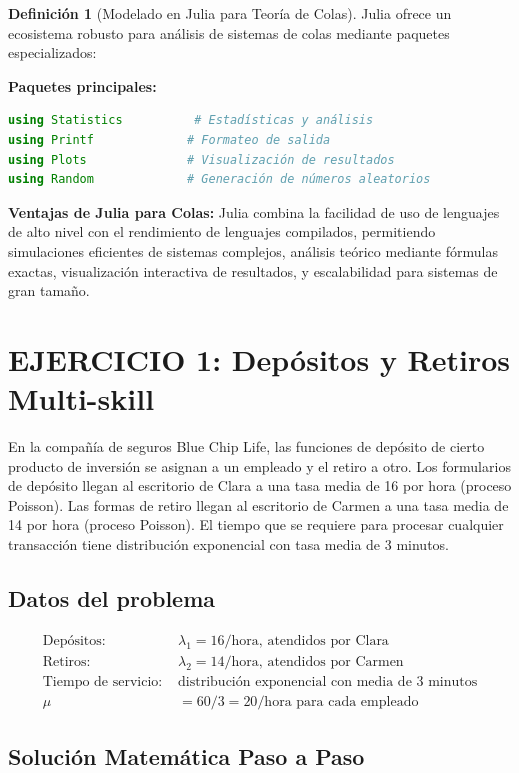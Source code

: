 \documentclass[12pt, a4paper, oneside]{book}
\theoremstyle{definition}
\newtheorem{definicion}{Definición}[chapter]
\begin{document}
\begin{definicion}[Modelado en Julia para Teoría de Colas]
Julia ofrece un ecosistema robusto para análisis de sistemas de colas mediante paquetes especializados:

\textbf{Paquetes principales:}
\begin{lstlisting}[language=Julia]
using Statistics          # Estadísticas y análisis
using Printf             # Formateo de salida
using Plots              # Visualización de resultados
using Random             # Generación de números aleatorios
\end{lstlisting}

\textbf{Ventajas de Julia para Colas:}
Julia combina la facilidad de uso de lenguajes de alto nivel con el rendimiento de lenguajes compilados, permitiendo simulaciones eficientes de sistemas complejos, análisis teórico mediante fórmulas exactas, visualización interactiva de resultados, y escalabilidad para sistemas de gran tamaño.
\end{definicion}
\section{EJERCICIO 1: Depósitos y Retiros Multi-skill}

En la compañía de seguros Blue Chip Life, las funciones de depósito de cierto producto de inversión se asignan a un empleado y el retiro a otro. Los formularios de depósito llegan al escritorio de Clara a una tasa media de 16 por hora (proceso Poisson). Las formas de retiro llegan al escritorio de Carmen a una tasa media de 14 por hora (proceso Poisson). El tiempo que se requiere para procesar cualquier transacción tiene distribución exponencial con tasa media de 3 minutos.

\subsection{Datos del problema}
\begin{align*}
\text{Depósitos: } &\lambda_1 = 16\text{/hora, atendidos por Clara} \\
\text{Retiros: } &\lambda_2 = 14\text{/hora, atendidos por Carmen} \\
\text{Tiempo de servicio: } &\text{distribución exponencial con media de 3 minutos} \\
\mu &= 60/3 = 20\text{/hora para cada empleado}
\end{align*}

\subsection{Solución Matemática Paso a Paso}
\end{document}
